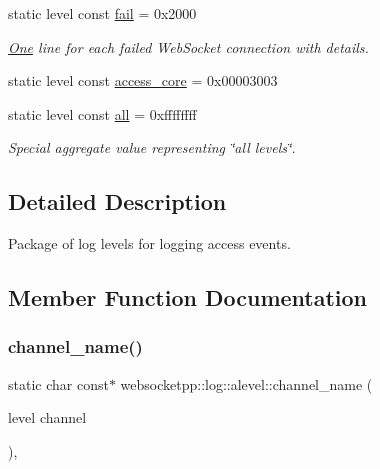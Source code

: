 \begin{DoxyCompactItemize}
\mbox{\label{structwebsocketpp_1_1log_1_1alevel_a2e485329910f92f8f6356cf27bafd4a2}} 
static level const \mbox{\hyperlink{structwebsocketpp_1_1log_1_1alevel_a2e485329910f92f8f6356cf27bafd4a2}{fail}} = 0x2000
\begin{DoxyCompactList}\small\item\em \mbox{\hyperlink{struct_one}{One}} line for each failed Web\+Socket connection with details. \end{DoxyCompactList}\item 
static level const \mbox{\hyperlink{structwebsocketpp_1_1log_1_1alevel_af5fdb4de43a77cacb4c3a5b01b816750}{access\+\_\+core}} = 0x00003003
\item 
\mbox{\label{structwebsocketpp_1_1log_1_1alevel_a853aa0b8976e53f3181af3bc398d493e}} 
static level const \mbox{\hyperlink{structwebsocketpp_1_1log_1_1alevel_a853aa0b8976e53f3181af3bc398d493e}{all}} = 0xffffffff
\begin{DoxyCompactList}\small\item\em Special aggregate value representing \char`\"{}all levels\char`\"{}. \end{DoxyCompactList}\end{DoxyCompactItemize}


\subsection{Detailed Description}
Package of log levels for logging access events. 

\subsection{Member Function Documentation}
\mbox{\label{structwebsocketpp_1_1log_1_1alevel_a7145c18f40f74cff4946994c14634ce9}} 
\subsubsection{\texorpdfstring{channel\+\_\+name()}{channel\_name()}}
{\footnotesize\ttfamily static char const$\ast$ websocketpp\+::log\+::alevel\+::channel\+\_\+name (\begin{DoxyParamCaption}\item[{level}]{channel }\end{DoxyParamCaption})\hspace{0.3cm}{\ttfamily [inline]}, {\ttfamily [static]}}



